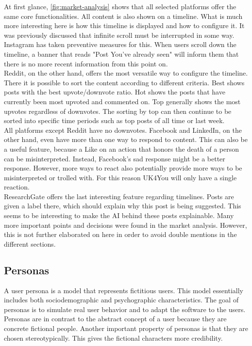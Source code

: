 At first glance, \autoref{fig:market-analysis} shows that all selected platforms offer the same core functionalities.
All content is also shown on a timeline.
What is much more interesting here is how this timeline is displayed and how to configure it.
It was previously discussed that infinite scroll must be interrupted in some way.
Instagram has taken preventive measures for this.
When users scroll down the timeline, a banner that reads "Post You've already seen" will inform them that there is no more recent information from this point on.\\

Reddit, on the other hand, offers the most versatile way to configure the timeline.
There it is possible to sort the content according to different criteria.
Best shows posts with the best upvote/downvote ratio. Hot shows the posts that have currently been most upvoted and commented on.
Top generally shows the most upvotes regardless of downvotes.
The sorting by top can then continue to be sorted into specific time periods such as top posts of all time or last week.\\

All platforms except Reddit have no downvotes.
Facebook and LinkedIn, on the other hand, even have more than one way to respond to content.
This can also be a useful feature, because a Like on an action that honors the death of a person can be misinterpreted.
Instead, Facebook's sad response might be a better response.
However, more ways to react also potentially provide more ways to be misinterpreted or trolled with.
For this reason UK4You will only have a single reaction.\\

ResearchGate offers the last interesting feature regarding timelines.
Posts are given a label there, which should explain why this post is being suggested.
This seems to be interesting to make the AI behind these posts explainable.
Many more important points and decisions were found in the market analysis.
However, this is not further elaborated on here in order to avoid double mentions in the different sections.\\

\subsection{Personas}
A user persona is a model that represents fictitious users\cite[p. 123]{cooper-alan}.
This model essentially includes both sociodemographic and psychographic characteristics.
The goal of personas is to simulate real user behavior and to adapt the software to the users.
Personas are in contrast to the abstract concept of a user because they are concrete fictional people.
Another important property of personas is that they are chosen stereotypically.
This gives the fictional characters more credibility\cite[p.127]{cooper-alan}.\\

